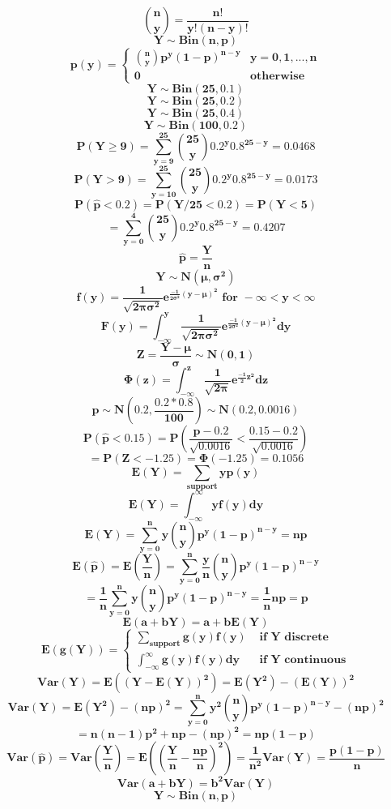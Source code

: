 \documentclass[12pt,portrait,semhelv,semrot]{article}
\begin{document}
{{$$\boldsymbol{\binom{n}{y} = \frac{n!}{y!(n-y)!}}$$
$$\boldsymbol{Y\sim Bin(n,p)}$$
$$\boldsymbol{p(y) = \begin{cases} \binom{n}{y}p^y(1-p)^{n-y} & y = 0, 1, ..., n \\ 0 & \mbox{otherwise}\end{cases}}$$
$$\boldsymbol{Y\sim Bin(25,0.1)}$$
$$\boldsymbol{Y\sim Bin(25,0.2)}$$
$$\boldsymbol{Y\sim Bin(25,0.4)}$$
$$\boldsymbol{Y\sim Bin(100,0.2)}$$
$$\boldsymbol{P(Y\geq 9) = \sum_{y=9}^{25}\binom{25}{y}0.2^y 0.8^{25-y}= 0.0468}$$
$$\boldsymbol{P(Y > 9) = \sum_{y=10}^{25}\binom{25}{y}0.2^y 0.8^{25-y}= 0.0173}$$
$$\boldsymbol{P(\hat{p} < 0.2) = P(Y/25 < 0.2)=P(Y<5) }$$
$$ \boldsymbol{= \sum_{y=0}^{4}\binom{25}{y}0.2^y 0.8^{25-y}= 0.4207}$$
$$\boldsymbol{\hat{p}= \frac{Y}{n}}$$
$$\boldsymbol{Y\sim N(\mu, \sigma^2)}$$
$$\boldsymbol{f(y) = \frac{1}{\sqrt{2\pi\sigma^2}}e^{\frac{-1}{2\sigma^2}(y-\mu)^2} \mbox{ for }-\infty < y < \infty}$$
$$\boldsymbol{F(y) = \int_{-\infty}^{y}\frac{1}{\sqrt{2\pi\sigma^2}}e^{\frac{-1}{2\sigma^2}(y-\mu)^2}dy}$$
$$\boldsymbol{Z = \frac{Y-\mu}{\sigma}\sim N(0,1)}$$
$$\boldsymbol{\Phi(z) = \int_{-\infty}^{z}\frac{1}{\sqrt{2\pi}}e^{\frac{-1}{2}z^2}dz}$$
$$\boldsymbol{\hat{p}\sim N\left(0.2, \frac{0.2*0.8}{100}\right)\sim N(0.2, 0.0016)}$$
$$\boldsymbol{P(\hat{p}<0.15) = P\left(\frac{\hat{p}-0.2}{\sqrt{0.0016}}< \frac{0.15-0.2}{\sqrt{0.0016}}\right)}$$
$$\boldsymbol{= P(Z < -1.25) = \Phi(-1.25) = 0.1056}$$
$$\boldsymbol{E(Y) = \sum_{support} y p(y)}$$
$$\boldsymbol{E(Y) = \int_{-\infty}^{\infty} y f(y)dy}$$
$$\boldsymbol{E(Y) = \sum_{y=0}^{n} y\binom{n}{y}p^{y}(1-p)^{n-y} = np}$$
$$\boldsymbol{E(\hat{p}) = E\left(\frac{Y}{n}\right) = \sum_{y=0}^{n} \frac{y}{n}\binom{n}{y}p^{y}(1-p)^{n-y}}$$
$$\boldsymbol{= \frac{1}{n}\sum_{y=0}^{n} y\binom{n}{y}p^{y}(1-p)^{n-y} = \frac{1}{n}np = p}$$
$$\boldsymbol{E(a + bY) = a + bE(Y)}$$
$$\boldsymbol{E(g(Y)) = \begin{cases} \sum_{support}g(y)f(y) & \mbox{ if Y discrete} \\ 
\int_{-\infty}^{\infty}g(y)f(y)dy & \mbox{ if Y continuous}\end{cases}}$$
$$\boldsymbol{Var(Y) = E\left((Y-E(Y))^2\right) = E(Y^2) - \left(E(Y)\right)^2}$$
$$\boldsymbol{Var(Y) = E(Y^2) - (np)^2 = \sum_{y=0}^{n}y^2\binom{n}{y}p^y(1-p)^{n-y} - (np)^2}$$
$$\boldsymbol{= n(n-1)p^2 + np -(np)^2 = np(1-p)}$$
$$\boldsymbol{Var(\hat{p}) = Var\left(\frac{Y}{n}\right) = E\left(\left(\frac{Y}{n}-\frac{np}{n}\right)^2\right) = \frac{1}{n^2}Var(Y) = \frac{p(1-p)}{n}}$$
$$\boldsymbol{Var(a+bY) = b^2Var(Y)}$$
$$\boldsymbol{Y\sim Bin(n,p)}$$
}}
\end{document}
